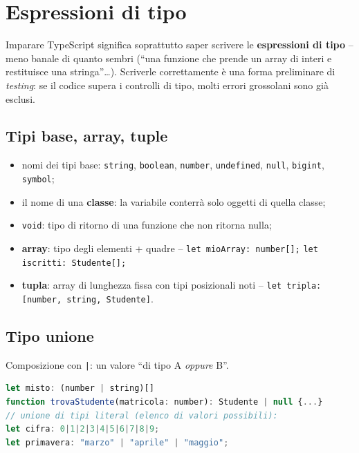 \section{Espressioni di tipo}

Imparare TypeScript significa soprattutto saper scrivere le \textbf{espressioni di tipo} --
meno banale di quanto sembri (``una funzione che prende un array di interi e restituisce una
stringa''\dots). Scriverle correttamente \`e una forma preliminare di \emph{testing}: se il
codice supera i controlli di tipo, molti errori grossolani sono gi\`a esclusi.

\subsection{Tipi base, array, tuple}
\begin{itemize}
  \item nomi dei tipi base: \texttt{string}, \texttt{boolean}, \texttt{number},
        \texttt{undefined}, \texttt{null}, \texttt{bigint}, \texttt{symbol};
  \item il nome di una \textbf{classe}: la variabile conterr\`a solo oggetti di quella classe;
  \item \texttt{void}: tipo di ritorno di una funzione che non ritorna nulla;
  \item \textbf{array}: tipo degli elementi + quadre --
        \texttt{let mioArray: number[];} \texttt{let iscritti: Studente[];}
  \item \textbf{tupla}: array di lunghezza fissa con tipi posizionali noti --
        \texttt{let tripla: [number, string, Studente]}.
\end{itemize}

\subsection{Tipo unione}
Composizione con \texttt{|}: un valore ``di tipo A \emph{oppure} B''.
\begin{lstlisting}[language=JavaScript]
let misto: (number | string)[]
function trovaStudente(matricola: number): Studente | null {...}
// unione di tipi literal (elenco di valori possibili):
let cifra: 0|1|2|3|4|5|6|7|8|9;
let primavera: "marzo" | "aprile" | "maggio";
\end{lstlisting}

